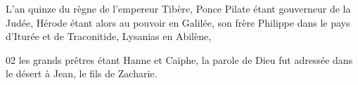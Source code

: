 L’an quinze du règne de l’empereur Tibère, Ponce Pilate étant gouverneur de la Judée, Hérode étant alors au pouvoir en Galilée, son frère Philippe dans le pays d’Iturée et de Traconitide, Lysanias en Abilène,

02 les grands prêtres étant Hanne et Caïphe, la parole de Dieu fut adressée dans le désert à Jean, le fils de Zacharie.